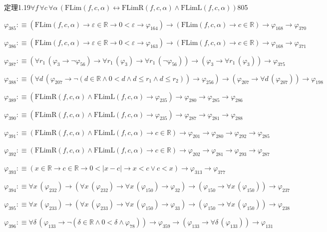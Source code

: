 \begin{fullproof}{定理1.19}{$\forall f\,\forall c\,\forall \alpha\,(\mathrm{FLim}(f,c,\alpha) \leftrightarrow \mathrm{FLimR}(f,c,\alpha) \land \mathrm{FLimL}(f,c,\alpha))$}{805}
\begin{abbrevlist}
\item $\varphi_{385} :\equiv (\mathrm{FLim}(f,c,\alpha) \to \varepsilon \in \mathbb{R} \to 0 < \varepsilon \to \varphi_{164}) \to (\mathrm{FLim}(f,c,\alpha) \to c \in \mathbb{R}) \to \varphi_{168} \to \varphi_{370}$
\item $\varphi_{386} :\equiv (\mathrm{FLim}(f,c,\alpha) \to \varepsilon \in \mathbb{R} \to 0 < \varepsilon \to \varphi_{163}) \to (\mathrm{FLim}(f,c,\alpha) \to c \in \mathbb{R}) \to \varphi_{168} \to \varphi_{371}$
\item $\varphi_{387} :\equiv (\forall r_{1}\,(\varphi_{3} \to \neg \varphi_{56}) \to \forall r_{1}\,(\varphi_{3}) \to \forall r_{1}\,(\neg \varphi_{56})) \to (\varphi_{3} \to \forall r_{1}\,(\varphi_{3})) \to \varphi_{375}$
\item $\varphi_{388} :\equiv (\forall d\,(\varphi_{207} \to \neg (d \in \mathbb{R} \land 0 < d \land d \leq r_{1} \land d \leq r_{2})) \to \varphi_{256}) \to (\varphi_{207} \to \forall d\,(\varphi_{207})) \to \varphi_{198}$
\item $\varphi_{389} :\equiv (\mathrm{FLimR}(f,c,\alpha) \land \mathrm{FLimL}(f,c,\alpha) \to \varphi_{235}) \to \varphi_{280} \to \varphi_{285} \to \varphi_{286}$
\item $\varphi_{390} :\equiv (\mathrm{FLimR}(f,c,\alpha) \land \mathrm{FLimL}(f,c,\alpha) \to \varphi_{235}) \to \varphi_{287} \to \varphi_{281} \to \varphi_{288}$
\item $\varphi_{391} :\equiv (\mathrm{FLimR}(f,c,\alpha) \land \mathrm{FLimL}(f,c,\alpha) \to c \in \mathbb{R}) \to \varphi_{201} \to \varphi_{280} \to \varphi_{292} \to \varphi_{285}$
\item $\varphi_{392} :\equiv (\mathrm{FLimR}(f,c,\alpha) \land \mathrm{FLimL}(f,c,\alpha) \to c \in \mathbb{R}) \to \varphi_{202} \to \varphi_{281} \to \varphi_{293} \to \varphi_{287}$
\item $\varphi_{393} :\equiv (x \in \mathbb{R} \to c \in \mathbb{R} \to 0 < \lvert x - c \rvert \to x < c \lor c < x) \to \varphi_{313} \to \varphi_{377}$
\item $\varphi_{394} :\equiv \forall x\,(\varphi_{232}) \to (\forall x\,(\varphi_{232}) \to \forall x\,(\varphi_{150}) \to \varphi_{32}) \to (\varphi_{150} \to \forall x\,(\varphi_{150})) \to \varphi_{237}$
\item $\varphi_{395} :\equiv \forall x\,(\varphi_{233}) \to (\forall x\,(\varphi_{233}) \to \forall x\,(\varphi_{150}) \to \varphi_{33}) \to (\varphi_{150} \to \forall x\,(\varphi_{150})) \to \varphi_{238}$
\item $\varphi_{396} :\equiv \forall \delta\,(\varphi_{133} \to \neg (\delta \in \mathbb{R} \land 0 < \delta \land \varphi_{78})) \to \varphi_{359} \to (\varphi_{133} \to \forall \delta\,(\varphi_{133})) \to \varphi_{131}$

\end{abbrevlist}
\end{fullproof}
